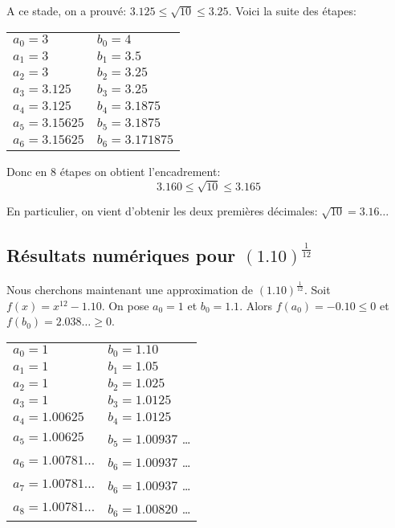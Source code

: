 \documentclass[a4paper,12pt]{article}
\begin{document}
    A ce stade, on a prouvé: $3.125 \leq \sqrt{10} \leq 3.25$.
    Voici la suite des étapes: 
    \begin{center}
        \begin{tabular}{l l}
            $a_0 = 3$   &  $b_0 = 4$ \\
            $a_1 = 3$   &  $b_1 = 3.5$ \\
            $a_2 = 3$   &  $b_2 = 3.25$ \\
            $a_3 = 3.125$   &  $b_3 = 3.25$ \\
            $a_4= 3.125$   &  $b_4 =3.1875$ \\
            $a_5 = 3.15625$   &  $b_5 = 3.1875$ \\
            $a_6 = 3.15625$   &  $b_6 = 3.171875$ \\
        \end{tabular}    
    \end{center}
    
    Donc en 8 étapes on obtient l'encadrement:
    $$ 3.160 \leq \sqrt{10} \leq 3.165 $$

    En particulier, on vient d'obtenir les deux premières décimales: $\sqrt{10} = 3.16 \dots$

\subsection{Résultats numériques pour $(1.10)^{\frac{1}{12}}$}
    Nous cherchons maintenant une approximation de $(1.10)^{\frac{1}{12}}$. Soit $f(x) = x^12 - 1.10 $. On pose $a_0 = 1$ et $b_0 = 1.1$. Alors $f(a_0) = -0.10 \leq 0$ et $f(b_0) = 2.038 \dots \geq 0$.

    \begin{center}
        \begin{tabular}{l l}
            $a_0 = 1$   &  $b_0 = 1.10$ \\
            $a_1 = 1$   &  $b_1 = 1.05$ \\
            $a_2 = 1$   &  $b_2 = 1.025$ \\
            $a_3 = 1$   &  $b_3 = 1.0125$ \\
            $a_4 = 1.00625$   &  $b_4 =1.0125$ \\
            $a_5 = 1.00625$   &  $b_5 = 1.00937$ \dots\\
            $a_6 = 1.00781 \dots$   &  $b_6 = 1.00937$ \dots\\
            $a_7 = 1.00781 \dots$   &  $b_6 = 1.00937$ \dots\\
            $a_8 = 1.00781 \dots$   &  $b_6 = 1.00820$ \dots\\
        \end{tabular}
    \end{center}
\end{document}
